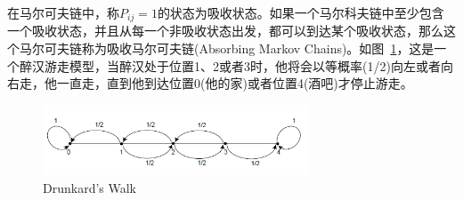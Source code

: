 \documentclass[12pt]{article}
\begin{document}
在马尔可夫链中，称$P_{ij}=1$的状态为吸收状态。如果一个马尔科夫链中至少包含一个吸收状态，并且从每一个非吸收状态出发，都可以到达某个吸收状态，那么这个马尔可夫链称为吸收马尔可夫链(Absorbing Markov Chains)。如图~\ref{fig: Drunkard-Walk}，这是一个醉汉游走模型，当醉汉处于位置1、2或者3时，他将会以等概率(1/2)向左或者向右走，他一直走，直到他到达位置0(他的家)或者位置4(酒吧)才停止游走。
\begin{figure}[!ht]
\centering
\includegraphics[width=0.7\textwidth]{Drunkard-Walk.png}
\caption{Drunkard's Walk}
\label{fig: Drunkard-Walk}
\end{figure}






















%


\end{document}
